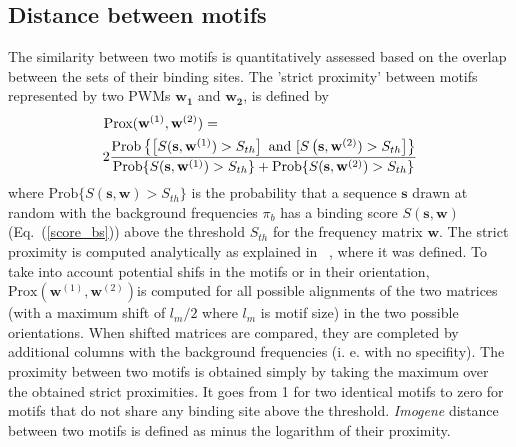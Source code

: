 \documentclass[a4,center,fleqn]{NAR}
\begin{document}
\subsection{Distance between motifs}
The similarity between two motifs is quantitatively assessed based on the overlap between the sets of their binding sites. The 'strict proximity' between motifs represented
by two PWMs $\mathbf{w_1}$ and $\mathbf{w_2}$,
is defined by
\begin{eqnarray}
   \mathrm{Prox(\mathbf{w}^{(1)},\mathbf{w}^{(2)})}=\hskip5.cm\nonumber\\ 2 \frac{\mathrm{Prob}\left\{\left[S(\mathbf{s},\mathbf{w}^{(1)})>S_{th}\right]\ \textrm{and}\  
[S\left(\mathbf{s},\mathbf{w}^{(2)})> S_{th}\right]\right\}}{\mathrm{Prob}\{S(\mathbf{s},\mathbf{w}^{(1)})
>S_{th}\}+\mathrm{Prob}\{S(\mathbf{s},\mathbf{w}^{(2)})>S_{th}\}}
\label{defprox}
\end{eqnarray}
 where $\mathrm{Prob}\{S(\mathbf{s},\mathbf{w})>S_{th}\}$ is the probability that a sequence $\mathbf{s}$ 
 drawn at random 
with the background frequencies $\pi_b$ %
has a binding score $S(\mathbf{s},\mathbf{w})$ (Eq.~(\ref{score_bs})) above the threshold
 $S_{th}$ for the frequency matrix $\mathbf{w}$.  
 The strict proximity is computed analytically as
explained
in ~\cite{Rouault:2010fk}, where it was defined. 
To take into account  potential shifs in the motifs 
or in their orientation, $\mathrm{Prox}(\mathbf{w}^{(1)},\mathbf{w}^{(2)})$is computed for all  possible alignments of the two matrices (with a maximum shift of $l_m/2$ where $l_m$ is motif size) in the two possible orientations. When shifted matrices are
compared, they are completed by  additional columns with the background frequencies (i. e. with no specifity). The proximity between  two motifs is obtained simply by taking the maximum over the obtained strict proximities.
It goes from 1 for two identical motifs to zero for motifs that do not share any binding site above the threshold. {\em Imogene} distance between two motifs is defined as minus the logarithm of their proximity.
\end{document}
